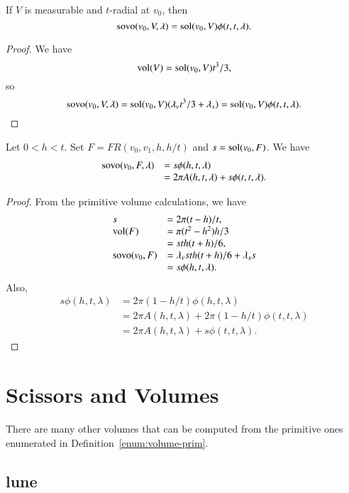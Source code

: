 \begin{lemma} If $V$ is measurable and $t$-radial at $v_0$,
then $${\operatorname{sovo}}(v_0,V,\lambda) = {\operatorname{sol}}(v_0,V)\phi(t,t,\lambda).$$
\end{lemma}

\begin{proof} We have $${\operatorname{vol}}(V) = {\operatorname{sol}}(v_0,V)t^3/3,$$
so $${\operatorname{sovo}}(v_0,V,\lambda) = 
  {\operatorname{sol}}(v_0,V)(\lambda_v t^3/3 + \lambda_s) = 
   {\operatorname{sol}}(v_0,V)\phi(t,t,\lambda).$$
\end{proof}

\begin{lemma} Let $0 < h < t$.
Set $F  = FR(v_0,v_1,h,h/t)$ and $s = \operatorname{sol}(v_0,F)$.
  We have
  $$
  \begin{array}{lll}
  {\operatorname{sovo}}(v_0,F,\lambda) 
   &= s
  \phi(h,t,\lambda) \\
   &= 2\pi A(h,t,\lambda) + s\phi(t,t,\lambda).
  \end{array}
  $$
\end{lemma}

\begin{proof}    From the primitive volume calculations,
we have 
  $$
  \begin{array}{lll}
  s &= 2\pi(t-h)/t,\\
  {\operatorname{vol}}(F) &= \pi(t^2-h^2)h/3\\
      &= s t h (t+h)/6,\\
  {\operatorname{sovo}}(v_0,F) &= 
     \lambda_v s t h (t+h)/6 + \lambda_s s\\
   &= s \phi(h,t,\lambda).
  \end{array}
  $$
Also,
  $$
  \begin{array}{lll}
  s\phi(h,t,\lambda) &= 2\pi (1-h/t)\phi(h,t,\lambda)\\
  &= 2\pi A(h,t,\lambda) + 2\pi (1-h/t)\phi(t,t,\lambda)\\
  &= 2\pi A(h,t,\lambda) + s \phi(t,t,\lambda).
  \end{array}
  $$
\end{proof}

\section{Scissors and Volumes}

There are many other volumes that can be computed from the
primitive ones enumerated in Definition~\ref{enum:volume-prim}.

\subsection{lune}  

